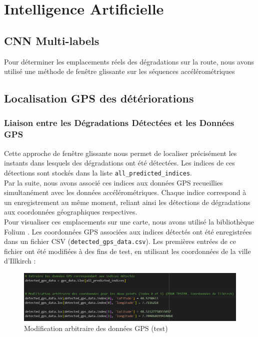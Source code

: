 \section{Intelligence Artificielle}

\subsection{CNN Multi-labels}

Pour déterminer les emplacements réels des dégradations sur la route, nous avons utilisé une méthode de fenêtre glissante sur les séquences accélérométriques \cite{fenetre_glissante}

\subsection {Localisation GPS des détériorations}

\subsubsection{Liaison entre les Dégradations Détectées et les Données GPS}

Cette approche de fenêtre glissante nous permet de localiser précisément les instants dans lesquels des dégradations ont été détectées. Les indices de ces détections sont stockés dans la liste \texttt{all\_predicted\_indices}.\\

Par la suite, nous avons associé ces indices aux données GPS recueillies simultanément avec les données accélérométriques. Chaque indice correspond à un enregistrement au même moment, reliant ainsi les détections de dégradations aux coordonnées géographiques respectives.\\

Pour visualiser ces emplacements sur une carte, nous avons utilisé la bibliothèque Folium \cite{folium}. Les coordonnées GPS associées aux indices détectés ont été enregistrées dans un fichier CSV (\texttt{detected\_gps\_data.csv}). Les premières entrées de ce fichier ont été modifiées à des fins de test, en utilisant les coordonnées de la ville d'Illkirch \cite{gps_site}:\\

\begin{figure}[H]
    \centering
    \includegraphics[width=0.9\linewidth]{img/gps_a_la_main.png}
    \caption{Modification arbitraire des données GPS (test)}
\end{figure}

